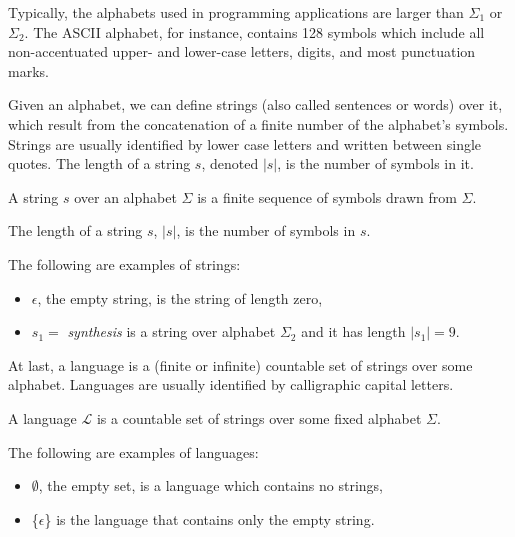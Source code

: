 Typically, the alphabets used in programming applications are larger than \(\Sigma_1\) or \(\Sigma_2\). The ASCII alphabet, for instance, contains 128 symbols which include all non-accentuated upper- and lower-case letters, digits, and most punctuation marks.

Given an alphabet, we can define strings (also called sentences or words) over it, which result from the concatenation of a finite number of the alphabet's symbols. Strings are usually identified by lower case letters and written between single quotes. The length of a string \(s\), denoted \(|s|\), is the number of symbols in it.

\begin{definition}[String]
A string \(s\) over an alphabet \(\Sigma\) is a finite sequence of symbols drawn from \(\Sigma\).
\end{definition}

\begin{definition}
The length of a string \(s\), \(|s|\), is the number of symbols in \(s\).
\end{definition}

\begin{example}
The following are examples of strings:
\begin{itemize}[nosep]
\item \(\epsilon\), the empty string, is the string of length zero,\par
\item \(s_1 = \) \textit{synthesis} is a string over alphabet \(\Sigma_2\) and it has length \(|s_1| = 9\).
\end{itemize}
\end{example}

At last, a language is a (finite or infinite) countable set of strings over some alphabet. Languages are usually identified by calligraphic capital letters.

\begin{definition}[Language]
A language \(\mathcal{L}\) is a countable set of strings over some fixed alphabet \(\Sigma\).
\end{definition}

\begin{example}
The following are examples of languages:
\begin{itemize}[nosep]
\item \(\emptyset\), the empty set, is a language which contains no strings,\par
\item \{\(\epsilon\)\} is the language that contains only the empty string.
\end{itemize}
\end{example}

